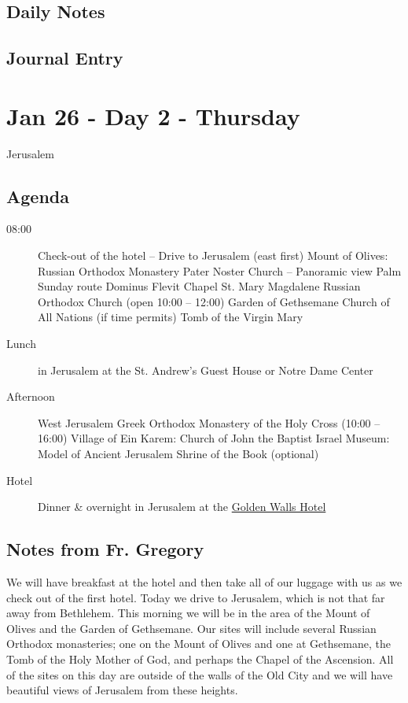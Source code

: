 \documentclass[letterpaper]{report}
\begin{document}
\clearpage
\subsection{Daily Notes}

\clearpage
\subsection{Journal Entry}

\clearpage
\section{Jan 26 - Day 2 - Thursday}
Jerusalem
\subsection{Agenda}
\begin{description}
	\item[08:00] Check-out of the hotel – Drive to Jerusalem (east first)
	    \subitem Mount of Olives: Russian Orthodox Monastery
	    \subitem Pater Noster Church -- Panoramic view
	    \subitem Palm Sunday route
	    \subitem Dominus Flevit Chapel
	    \subitem St. Mary Magdalene Russian Orthodox Church
	        (open 10:00 – 12:00)
	    \subitem Garden of Gethsemane
	    \subitem Church of All Nations (if time permits)
	    \subitem Tomb of the Virgin Mary
	\item[Lunch] in Jerusalem at the
			St. Andrew’s Guest House or Notre Dame Center
	\item[Afternoon] West Jerusalem
	    \subitem Greek Orthodox Monastery of the Holy Cross (10:00 – 16:00)
		\subitem Village of Ein Karem: Church of John the Baptist 
		\subitem Israel Museum: Model of Ancient Jerusalem
		\subitem Shrine of the Book (optional)
	\item[Hotel] Dinner \& overnight in Jerusalem at the
	    \href{http://goldenwalls.com/}{Golden Walls Hotel}
\end{description}

\subsection{Notes from Fr. Gregory}
We will have breakfast at the hotel and then take all of our luggage with us 
as we check out of the first hotel.
Today we drive to Jerusalem, which is not that far away from Bethlehem.
This morning we will be in the area of the Mount of Olives and the Garden of
Gethsemane.
Our sites will include several Russian Orthodox monasteries;
one on the Mount of Olives and one at Gethsemane,
the Tomb of the Holy Mother of God,
and perhaps the Chapel of the Ascension.
All of the sites on this day are outside of the walls of the Old City and we
will have beautiful views of Jerusalem from these heights.
\end{document}
